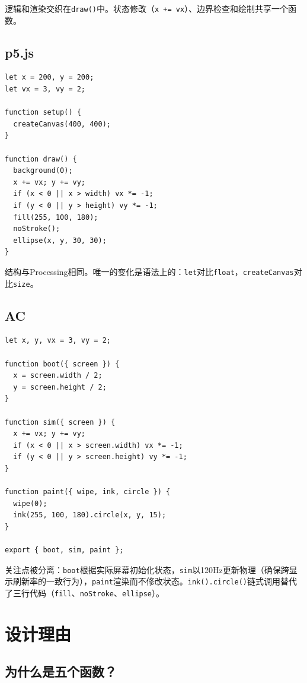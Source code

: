 \documentclass[10pt,letterpaper,twocolumn]{article}
\begin{document}
逻辑和渲染交织在\texttt{draw()}中。状态修改（\texttt{x += vx}）、边界检查和绘制共享一个函数。

\subsection{p5.js}

\begin{lstlisting}[style=p5style]
let x = 200, y = 200;
let vx = 3, vy = 2;

function setup() {
  createCanvas(400, 400);
}

function draw() {
  background(0);
  x += vx; y += vy;
  if (x < 0 || x > width) vx *= -1;
  if (y < 0 || y > height) vy *= -1;
  fill(255, 100, 180);
  noStroke();
  ellipse(x, y, 30, 30);
}
\end{lstlisting}

结构与Processing相同。唯一的变化是语法上的：\texttt{let}对比\texttt{float}，\texttt{createCanvas}对比\texttt{size}。

\subsection{AC}

\begin{lstlisting}[style=acjsstyle]
let x, y, vx = 3, vy = 2;

function boot({ screen }) {
  x = screen.width / 2;
  y = screen.height / 2;
}

function sim({ screen }) {
  x += vx; y += vy;
  if (x < 0 || x > screen.width) vx *= -1;
  if (y < 0 || y > screen.height) vy *= -1;
}

function paint({ wipe, ink, circle }) {
  wipe(0);
  ink(255, 100, 180).circle(x, y, 15);
}

export { boot, sim, paint };
\end{lstlisting}

关注点被分离：\texttt{boot}根据实际屏幕初始化状态，\texttt{sim}以120Hz更新物理（确保跨显示刷新率的一致行为），\texttt{paint}渲染而不修改状态。\texttt{ink().circle()}链式调用替代了三行代码（\texttt{fill}、\texttt{noStroke}、\texttt{ellipse}）。


\section{设计理由}
\label{sec:rationale}

\subsection{为什么是五个函数？}
\end{document}

